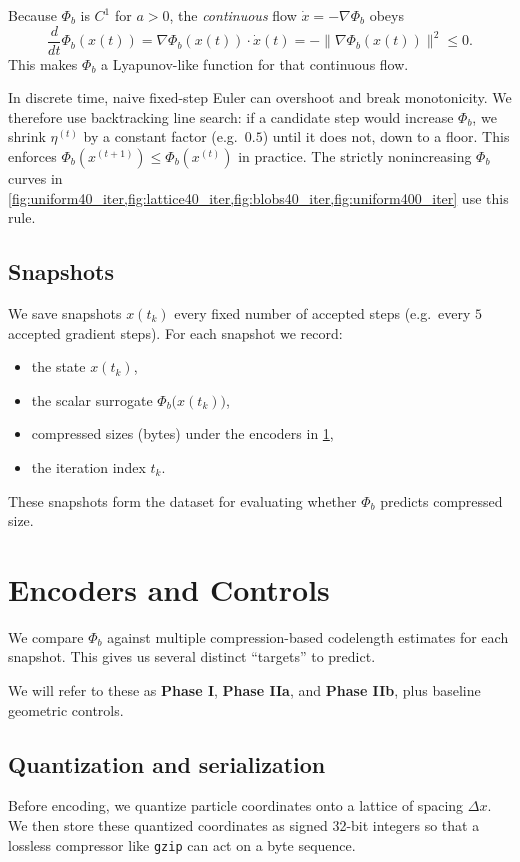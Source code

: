 \documentclass[11pt,a4paper]{article}
\numberwithin{equation}{section}
\newcommand{\norm}[1]{\lVert #1\rVert}
\newcommand{\phib}{\Phi_b}
\begin{document}
Because $\phib$ is $C^1$ for $a>0$, the \emph{continuous} flow $\dot x = -\nabla \phib$ obeys
\begin{equation}
\frac{d}{dt}\phib(x(t))
= \nabla \phib(x(t)) \cdot \dot x(t)
= - \norm{\nabla \phib(x(t))}^2 \le 0.
\end{equation}
This makes $\phib$ a Lyapunov-like function for that continuous flow.

In discrete time, naive fixed-step Euler can overshoot and break monotonicity. We therefore use backtracking line search: if a candidate step would increase $\phib$, we shrink $\eta^{(t)}$ by a constant factor (e.g.\ $0.5$) until it does not, down to a floor. This enforces $\phib(x^{(t+1)}) \le \phib(x^{(t)})$ in practice. The strictly nonincreasing $\phib$ curves in \cref{fig:uniform40_iter,fig:lattice40_iter,fig:blobs40_iter,fig:uniform400_iter} use this rule.

\subsection{Snapshots}
We save snapshots $x(t_k)$ every fixed number of accepted steps (e.g.\ every $5$ accepted gradient steps). For each snapshot we record:
\begin{itemize}
\item the state $x(t_k)$,
\item the scalar surrogate $\phib\big(x(t_k)\big)$,
\item compressed sizes (bytes) under the encoders in \cref{sec:encoders},
\item the iteration index $t_k$.
\end{itemize}

These snapshots form the dataset for evaluating whether $\phib$ predicts compressed size.

\section{Encoders and Controls}
\label{sec:encoders}

We compare $\phib$ against multiple compression-based codelength estimates for each snapshot. This gives us several distinct ``targets'' to predict.

We will refer to these as \textbf{Phase I}, \textbf{Phase IIa}, and \textbf{Phase IIb}, plus baseline geometric controls.

\subsection{Quantization and serialization}
Before encoding, we quantize particle coordinates onto a lattice of spacing $\Delta x$. We then store these quantized coordinates as signed 32-bit integers so that a lossless compressor like \texttt{gzip} can act on a byte sequence.
\end{document}
